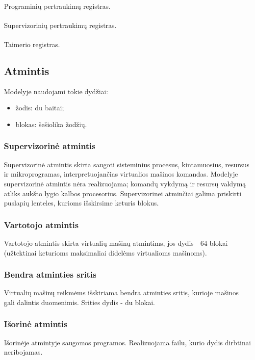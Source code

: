 \documentclass{scrartcl}
\begin{document}
                \paragraph{} Programinių pertraukimų registras.
                \paragraph{} Supervizorinių pertraukimų registras.
                \paragraph{} Taimerio registras.
        \subsection{Atmintis}
            Modelyje naudojami tokie dydžiai:
            \begin{itemize}
                \item žodis: du baitai;
                \item blokas: šešiolika žodžių.
            \end{itemize}
            \subsubsection{Supervizorinė atmintis}
                Supervizorinė atmintis skirta saugoti sisteminius procesus, kintamuosius, resursus ir mikroprogramas, interpretuojančias virtualios mašinos komandas. Modelyje supervizorinė atmintis nėra realizuojama; komandų vykdymą ir resursų valdymą atliks aukšto lygio kalbos procesorius. Supervizorinei atminčiai galima priskirti puslapių lenteles, kurioms išskirsime keturis blokus.
            \subsubsection{Vartotojo atmintis}
                Vartotojo atmintis skirta virtualių mašinų atmintims, jos dydis - 64 blokai (užtektinai keturioms maksimaliai didelėms virtualioms mašinoms).
            \subsubsection{Bendra atminties sritis}
                Virtualių mašinų reikmėms išskiriama bendra atminties sritis, kurioje mašinos gali dalintis duomenimis. Srities dydis - du blokai.
            \subsubsection{Išorinė atmintis}
                Išorinėje atmintyje saugomos programos. Realizuojama failu, kurio dydis dirbtinai neribojamas.
\end{document}
